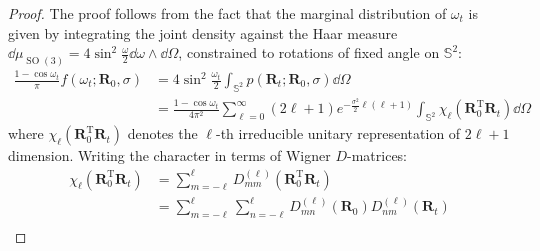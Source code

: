 \documentclass{article}
\theoremstyle{plain}
\theoremstyle{definition}
\theoremstyle{remark}
\DeclareMathOperator{\SO}{SO}
\begin{document}
\begin{proof}
    The proof follows from the fact that the marginal distribution of $\omega_t$ is given by integrating the joint density against the Haar measure $\dd \mu_{\SO(3)} = 4\sin^2\frac{\omega}{2}\dd\omega\wedge\dd\varOmega$, constrained to rotations of fixed angle on $\mathbb{S}^2$:
    \begin{equation}
        \begin{aligned}
            \frac{1-\cos\omega_t}{\pi}f(\omega_t; \mathbf{R}_0, \sigma) & =4\sin^2\frac{\omega_t}{2}\int_{\mathbb{S}^2} p(\mathbf{R}_t; \mathbf{R}_0,\sigma) \dd\varOmega \\
             &= \frac{1-\cos\omega_t}{4\pi^2}\sum_{\ell=0}^{\infty} (2\ell+1)e^{-\frac{\sigma^2}{2}\ell(\ell+1)}\int_{\mathbb{S}^2} \chi_\ell(\mathbf{R}_0^\mathrm{T}\mathbf{R}_t) \dd\varOmega
        \end{aligned}
    \end{equation}
    where $\chi_\ell(\mathbf{R}_0^\mathrm{T}\mathbf{R}_t)$ denotes the $\ell$-th irreducible unitary representation of $2\ell+1$ dimension. Writing the character in terms of Wigner $D$-matrices:
    \begin{equation}
        \begin{aligned}
            \chi_\ell(\mathbf{R}_0^\mathrm{T}\mathbf{R}_t) & = \sum_{m=-\ell}^{\ell} D_{mm}^{(\ell)}(\mathbf{R}_0^\mathrm{T}\mathbf{R}_t) \\
            & = \sum_{m=-\ell}^{\ell} \sum_{n=-\ell}^{\ell} D_{mn}^{(\ell)}(\mathbf{R}_0) D_{nm}^{(\ell)}(\mathbf{R}_t) \\
            \end{aligned}
    \end{equation}
    

\end{proof}
\end{document}
